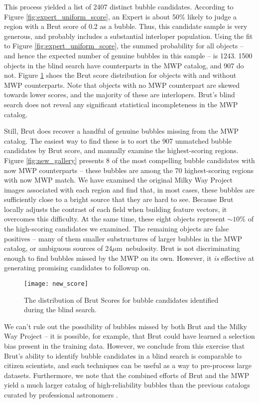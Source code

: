 \documentclass[preprint]{aastex}
\newcommand{\um}[0]{$\mu$m}
\begin{document}
This process yielded a list of 2407 distinct bubble candidates. According to Figure \ref{fig:expert_uniform_score}, an Expert is about 50\% likely to judge a region with a Brut score of 0.2 as a bubble. Thus, this candidate sample is very generous, and probably includes a substantial interloper population. Using the fit to Figure \ref{fig:expert_uniform_score}, the summed probability for all objects -- and hence the expected number of genuine bubbles in this sample -- is 1243. 1500 objects in the blind search have counterparts in the MWP catalog, and 907 do not. Figure \ref{fig:new_score} shoes the Brut score distribution for objects with and without MWP counterparts. Note that objects with no MWP counterpart are skewed towards lower scores, and the majority of these are interlopers. Brut's blind search does not reveal any significant statistical incompleteness in the MWP catalog.

Still, Brut does recover a handful of genuine bubbles missing from the MWP catalog. The easiest way to find these is to sort the 907 unmatched bubble candidates by Brut score, and manually examine the highest-scoring regions. Figure \ref{fig:new_gallery} presents 8 of the most compelling bubble candidates with now MWP counterparts -- these bubbles are among the 70 highest-scoring regions with now MWP match. We have examined the original Milky Way Project images associated with each region and find that, in most cases, these bubbles are sufficiently close to a bright source that they are hard to see. Because Brut locally adjusts the contrast of each field when building feature vectors, it overcomes this difficulty. At the same time, these eight objects represent $\sim 10\%$ of the high-scoring candidates we examined. The remaining objects are false positives -- many of them smaller substructures of larger bubbles in the MWP catalog, or ambiguous sources of 24\um\, nebulosity. Brut is not discriminating enough to find bubbles missed by the MWP on its own. However, it \textit{is} effective at generating promising candidates to followup on.

\begin{figure}[h!]
\texttt{[image: new\_score]}
\caption{The distribution of Brut Scores for bubble candidates identified during the blind search.}
\label{fig:new_score}
\end{figure}

We can't rule out the possibility of bubbles missed by both Brut and the Milky Way Project -- it is possible, for example, that Brut could have learned a selection bias present in the training data. However, we conclude from this exercise that Brut's ability to identify bubble candidates in a blind search is comparable to citizen scientists, and such techniques can be useful as a way to pre-process large datasets. Furthermore, we note that the combined efforts of Brut and the MWP yield a much larger catalog of high-reliability bubbles than the previous catalogs curated by professional astronomers \citep{Churchwell06, Churchwell07}. 
\end{document}
